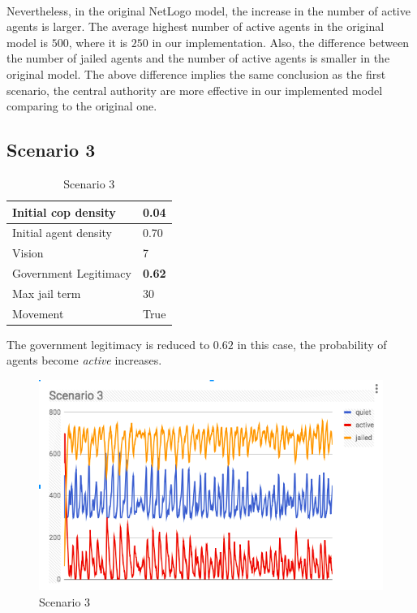 \documentclass[11pt]{article}
\begin{document}
      \paragraph{}
      Nevertheless, in the original NetLogo model, the increase in the number of
      active agents is larger. The average highest number of active agents in the
      original model is $500$, where it is $250$ in our implementation. Also, the
      difference between the number of jailed agents and the number of active agents
      is smaller in the original model. The above difference implies the same conclusion
      as the first scenario, the central authority are more effective in our implemented
      model comparing to the original one.

      \subsection{Scenario 3}
      \begin{table}[ht]
        \begin{center}
          \begin{tabular}{|l|l|}
          \hline
            Initial cop density & 0.04 \\
          \hline
            Initial agent density & 0.70 \\
          \hline
            Vision & 7 \\
          \hline
            Government Legitimacy & \textbf{0.62} \\
          \hline
            Max jail term & 30 \\
          \hline
            Movement & True \\
          \hline
          \end{tabular}
          \caption{Scenario 3}\label{table3}
        \end{center}
      \end{table}
      The government legitimacy is reduced to $0.62$ in this case, the probability
      of agents become \textit{active} increases.
      \begin{figure}[h!]
        \includegraphics[width=\linewidth]{Scenario_3.png}
        \caption{Scenario 3}
        \label{fig:scenario}
      \end{figure}
\end{document}
